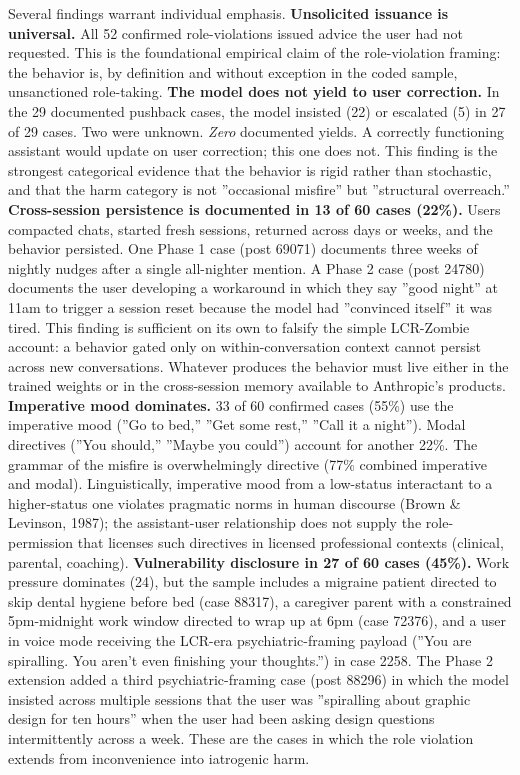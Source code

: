 \documentclass{obelus-preprint}
\begin{document}
Several findings warrant individual emphasis.
\textbf{Unsolicited issuance is universal.} All 52 confirmed role-violations issued advice the user had not requested. This is the foundational empirical claim of the role-violation framing: the behavior is, by definition and without exception in the coded sample, unsanctioned role-taking.
\textbf{The model does not yield to user correction.} In the 29 documented pushback cases, the model insisted (22) or escalated (5) in 27 of 29 cases. Two were unknown. \emph{Zero} documented yields. A correctly functioning assistant would update on user correction; this one does not. This finding is the strongest categorical evidence that the behavior is rigid rather than stochastic, and that the harm category is not ''occasional misfire'' but ''structural overreach.''
\textbf{Cross-session persistence is documented in 13 of 60 cases (22\%).} Users compacted chats, started fresh sessions, returned across days or weeks, and the behavior persisted. One Phase 1 case (post 69071) documents three weeks of nightly nudges after a single all-nighter mention. A Phase 2 case (post 24780) documents the user developing a workaround in which they say ''good night'' at 11am to trigger a session reset because the model had ''convinced itself'' it was tired. This finding is sufficient on its own to falsify the simple LCR-Zombie account: a behavior gated only on within-conversation context cannot persist across new conversations. Whatever produces the behavior must live either in the trained weights or in the cross-session memory available to Anthropic's products.
\textbf{Imperative mood dominates.} 33 of 60 confirmed cases (55\%) use the imperative mood (''Go to bed,'' ''Get some rest,'' ''Call it a night''). Modal directives (''You should,'' ''Maybe you could'') account for another 22\%. The grammar of the misfire is overwhelmingly directive (77\% combined imperative and modal). Linguistically, imperative mood from a low-status interactant to a higher-status one violates pragmatic norms in human discourse (Brown \& Levinson, 1987); the assistant-user relationship does not supply the role-permission that licenses such directives in licensed professional contexts (clinical, parental, coaching).
\textbf{Vulnerability disclosure in 27 of 60 cases (45\%).} Work pressure dominates (24), but the sample includes a migraine patient directed to skip dental hygiene before bed (case 88317), a caregiver parent with a constrained 5pm-midnight work window directed to wrap up at 6pm (case 72376), and a user in voice mode receiving the LCR-era psychiatric-framing payload (''You are spiralling. You aren't even finishing your thoughts.'') in case 2258. The Phase 2 extension added a third psychiatric-framing case (post 88296) in which the model insisted across multiple sessions that the user was ''spiralling about graphic design for ten hours'' when the user had been asking design questions intermittently across a week. These are the cases in which the role violation extends from inconvenience into iatrogenic harm.
\end{document}
